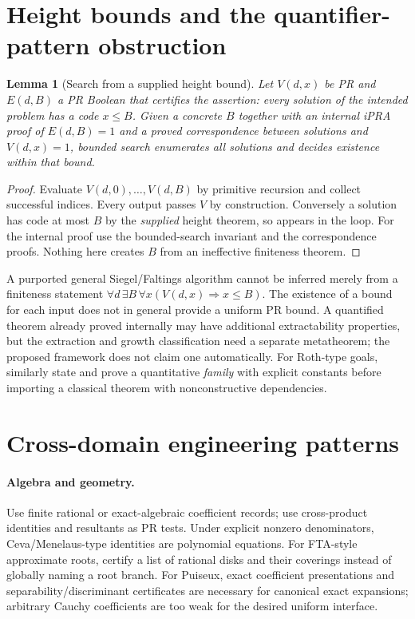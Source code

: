 \documentclass[11pt]{article}
\newtheorem{lemma}[theorem]{Lemma}
\begin{document}
\section{Height bounds and the quantifier-pattern obstruction}
\begin{lemma}[Search from a supplied height bound]
Let $V(d,x)$ be PR and $E(d,B)$ a PR Boolean that certifies the assertion: every solution of the intended problem has a code $x\le B$. Given a concrete $B$ together with an internal iPRA proof of $E(d,B)=1$ and a proved correspondence between solutions and $V(d,x)=1$, bounded search enumerates all solutions and decides existence within that bound.
\end{lemma}
\begin{proof}
Evaluate $V(d,0),\ldots,V(d,B)$ by primitive recursion and collect successful indices. Every output passes $V$ by construction. Conversely a solution has code at most $B$ by the \emph{supplied} height theorem, so appears in the loop. For the internal proof use the bounded-search invariant and the correspondence proofs. Nothing here creates $B$ from an ineffective finiteness theorem.\end{proof}
A purported general Siegel/Faltings algorithm cannot be inferred merely from a finiteness statement $\forall d\,\exists B\,\forall x( V(d,x)\Rightarrow x\le B)$. The existence of a bound for each input does not in general provide a uniform PR bound. A quantified theorem already proved internally may have additional extractability properties, but the extraction and growth classification need a separate metatheorem; the proposed framework does not claim one automatically. For Roth-type goals, similarly state and prove a quantitative \emph{family} with explicit constants before importing a classical theorem with nonconstructive dependencies.

\section{Cross-domain engineering patterns}
\paragraph{Algebra and geometry.} Use finite rational or exact-algebraic coefficient records; use cross-product identities and resultants as PR tests. Under explicit nonzero denominators, Ceva/Menelaus-type identities are polynomial equations. For FTA-style approximate roots, certify a list of rational disks and their coverings instead of globally naming a root branch. For Puiseux, exact coefficient presentations and separability/discriminant certificates are necessary for canonical exact expansions; arbitrary Cauchy coefficients are too weak for the desired uniform interface.
\end{document}
